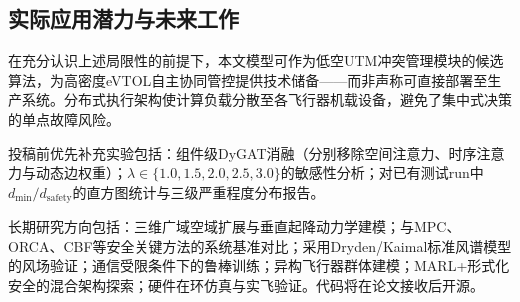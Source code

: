 \documentclass[12pt,a4paper,UTF8]{ctexart}
\begin{document}
\subsection{实际应用潜力与未来工作}

在充分认识上述局限性的前提下，本文模型可作为低空UTM冲突管理模块的候选算法，为高密度eVTOL自主协同管控提供技术储备——而非声称可直接部署至生产系统。分布式执行架构使计算负载分散至各飞行器机载设备，避免了集中式决策的单点故障风险。

投稿前优先补充实验包括：组件级DyGAT消融（分别移除空间注意力、时序注意力与动态边权重）；$\lambda \in \{1.0, 1.5, 2.0, 2.5, 3.0\}$的敏感性分析；对已有测试run中$d_{\min}/d_{\text{safety}}$的直方图统计与三级严重程度分布报告。

长期研究方向包括：三维广域空域扩展与垂直起降动力学建模；与MPC、ORCA、CBF等安全关键方法的系统基准对比；采用Dryden/Kaimal标准风谱模型的风场验证；通信受限条件下的鲁棒训练；异构飞行器群体建模；MARL+形式化安全的混合架构探索；硬件在环仿真与实飞验证。代码将在论文接收后开源。
\end{document}

